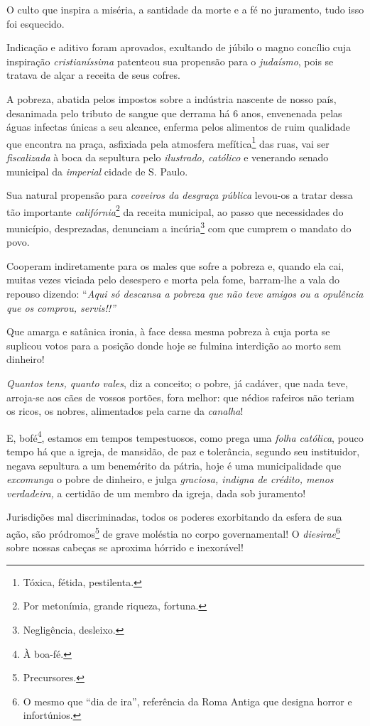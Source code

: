 O culto que inspira a miséria, a santidade da morte e a fé no juramento,
tudo isso foi esquecido.

Indicação e aditivo foram aprovados, exultando de júbilo o magno
concílio cuja inspiração \emph{cristianíssima} patenteou sua propensão
para o \emph{judaísmo}, pois se tratava de alçar a receita de seus
cofres.

A pobreza, abatida pelos impostos sobre a indústria nascente de nosso
país, desanimada pelo tributo de sangue que derrama há 6 anos,
envenenada pelas águas infectas únicas a seu alcance, enferma pelos
alimentos de ruim qualidade que encontra na praça, asfixiada pela
atmosfera mefítica\footnote{Tóxica, fétida, pestilenta.} das ruas, vai
ser \emph{fiscalizada} à boca da sepultura pelo \emph{ilustrado,
católico} e venerando senado municipal da \emph{imperial} cidade de S.
Paulo.

Sua natural propensão para \emph{coveiros da desgraça pública} levou-os
a tratar dessa tão importante \emph{califórnia}\footnote{Por
  metonímia, grande riqueza, fortuna.} da receita municipal, ao passo
que necessidades do município, desprezadas, denunciam a
incúria\footnote{Negligência, desleixo.} com que cumprem o mandato do
povo.

Cooperam indiretamente para os males que sofre a pobreza e, quando ela
cai, muitas vezes viciada pelo desespero e morta pela fome, barram-lhe a
vala do repouso dizendo: ``\emph{Aqui só descansa a pobreza que não teve
amigos ou a opulência que os comprou, servis!!''}

Que amarga e satânica ironia, à face dessa mesma pobreza à cuja porta se
suplicou votos para a posição donde hoje se fulmina interdição ao morto
sem dinheiro!

\emph{Quantos tens, quanto vales}, diz a conceito; o pobre, já cadáver,
que nada teve, arroja-se aos cães de vossos portões, fora melhor: que
nédios rafeiros não teriam os ricos, os nobres, alimentados pela carne
da \emph{canalha}!

E, bofé\footnote{À boa-fé.}, estamos em tempos tempestuosos, como
prega uma \emph{folha católica}, pouco tempo há que a igreja, de
mansidão, de paz e tolerância, segundo seu instituidor, negava sepultura
a um benemérito da pátria, hoje é uma municipalidade que
\emph{excomunga} o pobre de dinheiro, e julga \emph{graciosa, indigna de
crédito, menos verdadeira,} a certidão de um membro da igreja, dada sob
juramento!

Jurisdições mal discriminadas, todos os poderes exorbitando da esfera de
sua ação, são pródromos\footnote{Precursores.} de grave moléstia no
corpo governamental! O \emph{diesirae}\footnote{O mesmo que ``dia de
  ira'', referência da Roma Antiga que designa horror e infortúnios.}
sobre nossas cabeças se aproxima hórrido e inexorável!

